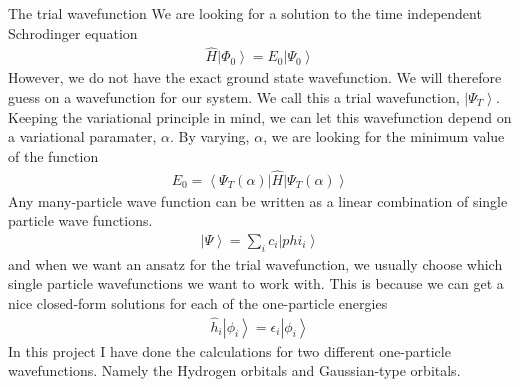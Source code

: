 \documentclass[a4paper, 12pt, titlepage]{article}
\begin{document}
\begin{section}{The trial wavefunction}
  We are looking for a solution to the time independent Schrodinger equation
  \begin{align}
  	\hat H \left| \Phi_0 \right> = E_0 \left| \Psi_0 \right>
  \end{align}
  However, we do not have the exact ground state wavefunction. We will therefore guess on a wavefunction for our system. We call this a trial wavefunction, $\left| \Psi_T \right>$. Keeping the variational principle in mind, we can let this wavefunction depend on a variational paramater, $\alpha$. By varying, $\alpha$, we are looking for the minimum value of the function
  \begin{align}
  	E_0 = \left< \Psi_T(\alpha) \right| \hat H \left| \Psi_T(\alpha) \right> 
  \end{align}
  Any many-particle wave function can be written as a linear combination of single particle wave functions.
  \begin{align}
  	\left| \Psi \right> = \sum_i c_i \left|phi_i \right> 
  \end{align}
  and when we want an ansatz for the trial wavefunction, we usually choose which single particle wavefunctions we want to work with. This is because we can get a nice closed-form solutions for each of the one-particle energies
  \begin{align}
  	\hat h_i \left| \phi_i \right> = \epsilon_i \left| \phi_i \right>	
  \end{align} 
  In this project I have done the calculations for two different one-particle wavefunctions. Namely the Hydrogen orbitals and Gaussian-type orbitals. 


\end{section}
\end{document}
